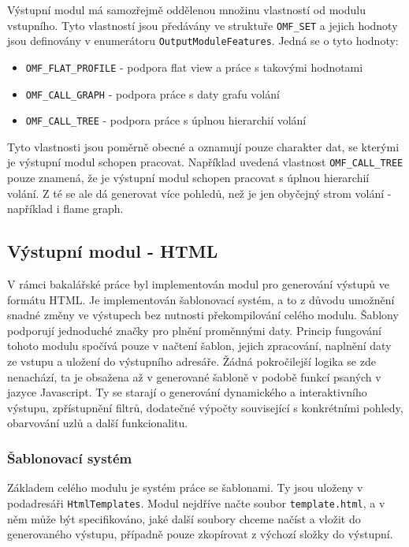 \documentclass[czech,BP]{thesiskiv}
\begin{document}
Výstupní modul má samozřejmě oddělenou množinu vlastností od modulu vstupního. Tyto vlastností jsou předávány ve struktuře \texttt{OMF\_SET} a jejich hodnoty jsou definovány v enumerátoru \texttt{OutputModuleFeatures}. Jedná se o tyto hodnoty:

\begin{itemize}
\item \texttt{OMF\_FLAT\_PROFILE} - podpora flat view a práce s takovými hodnotami
\item \texttt{OMF\_CALL\_GRAPH} - podpora práce s daty grafu volání
\item \texttt{OMF\_CALL\_TREE} - podpora práce s úplnou hierarchií volání
\end{itemize}

Tyto vlastnosti jsou poměrně obecné a oznamují pouze charakter dat, se kterými je výstupní modul schopen pracovat. Například uvedená vlastnost \texttt{OMF\_CALL\_TREE} pouze znamená, že je výstupní modul schopen pracovat s úplnou hierarchií volání. Z té se ale dá generovat více pohledů, než je jen obyčejný strom volání - například i flame graph.

\subsection{Výstupní modul - HTML}

V rámci bakalářské práce byl implementován modul pro generování výstupů ve formátu HTML. Je implementován šablonovací systém, a to z důvodu umožnění snadné změny ve výstupech bez nutnosti překompilování celého modulu. Šablony podporují jednoduché značky pro plnění proměnnými daty. Princip fungování tohoto modulu spočívá pouze v načtení šablon, jejich zpracování, naplnění daty ze vstupu a uložení do výstupního adresáře. Žádná pokročilejší logika se zde nenachází, ta je obsažena až v generované šabloně v podobě funkcí psaných v jazyce Javascript. Ty se starají o generování dynamického a interaktivního výstupu, zpřístupnění filtrů, dodatečné výpočty související s konkrétními pohledy, obarvování uzlů a další funkcionalitu.

\subsubsection*{Šablonovací systém}

Základem celého modulu je systém práce se šablonami. Ty jsou uloženy v podadresáři \texttt{HtmlTemplates}. Modul nejdříve načte soubor \texttt{template.html}, a v něm může být specifikováno, jaké další soubory chceme načíst a vložit do generovaného výstupu, případně pouze zkopírovat z výchozí složky do výstupní.
\end{document}
